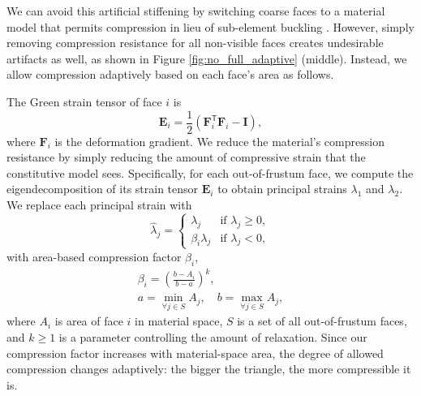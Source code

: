 \documentclass[10pt,journal,compsoc,twoside]{TexInputs/IEEEtran}
\begin{document}
We can avoid this artificial stiffening by switching coarse faces
to a material model that permits compression in lieu of sub-element buckling
\cite{Choi:2002:SBR,Wang:2010:MIS}.
However, simply removing compression resistance for all non-visible faces creates undesirable artifacts as well, as shown in Figure \ref{fig:no_full_adaptive} (middle). Instead, we allow compression adaptively based on each face's
area as follows.

The Green strain tensor of face $i$ is
\begin{equation}
  \textbf{E}_i = \frac{1}{2}(\textbf{F}_i^\mathsf{T} \textbf{F}_i - \textbf{I}),
\end{equation}
where $\mathbf F_i$ is the deformation gradient.
We reduce the material's compression resistance by simply reducing the amount of compressive strain that the constitutive model sees. Specifically, for each out-of-frustum face, we compute the eigendecomposition of its strain tensor $\textbf{E}_i$ to obtain principal strains $\lambda_1$ and $\lambda_2$. We replace each principal strain with
\begin{equation}
  \hat\lambda_j =
  \begin{cases}
    \lambda_j & \text{if } \lambda_j \geq 0, \\
    \beta_i\lambda_j & \text{if } \lambda_j < 0,
  \end{cases}
\end{equation}
with area-based compression factor $\beta_i$,
\begin{gather}
  \beta_i = \left(\frac{b - A_i}{b - a}\right)^k, \\
  a = \min_{\forall j \in S} A_j,\quad b = \max_{\forall j \in S} A_j,
\end{gather}
where $A_i$ is area of face $i$ in material space, $S$ is a set of all out-of-frustum
faces, and $k\ge1$ is a parameter controlling the amount of relaxation. Since our compression factor increases with material-space area, the degree of allowed compression changes adaptively: the bigger the triangle, the
more compressible it is.
\end{document}
